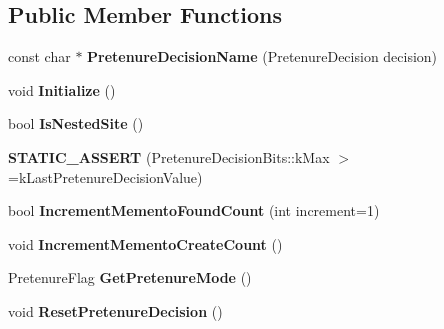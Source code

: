 \subsection*{Public Member Functions}
\begin{DoxyCompactItemize}
\item 
const char $\ast$ {\bfseries Pretenure\+Decision\+Name} (Pretenure\+Decision decision)\hypertarget{classv8_1_1internal_1_1_allocation_site_a015895d2a527877f98749eb13b16a38f}{}\label{classv8_1_1internal_1_1_allocation_site_a015895d2a527877f98749eb13b16a38f}

\item 
void {\bfseries Initialize} ()\hypertarget{classv8_1_1internal_1_1_allocation_site_a81f61008e147366d1eea6cdbae9d5ded}{}\label{classv8_1_1internal_1_1_allocation_site_a81f61008e147366d1eea6cdbae9d5ded}

\item 
bool {\bfseries Is\+Nested\+Site} ()\hypertarget{classv8_1_1internal_1_1_allocation_site_ab9a3fce3780154b3da48ae09cb0b8d46}{}\label{classv8_1_1internal_1_1_allocation_site_ab9a3fce3780154b3da48ae09cb0b8d46}

\item 
{\bfseries S\+T\+A\+T\+I\+C\+\_\+\+A\+S\+S\+E\+RT} (Pretenure\+Decision\+Bits\+::k\+Max $>$=k\+Last\+Pretenure\+Decision\+Value)\hypertarget{classv8_1_1internal_1_1_allocation_site_ad1c0e4e32b7e2db1483fa7a518bec030}{}\label{classv8_1_1internal_1_1_allocation_site_ad1c0e4e32b7e2db1483fa7a518bec030}

\item 
bool {\bfseries Increment\+Memento\+Found\+Count} (int increment=1)\hypertarget{classv8_1_1internal_1_1_allocation_site_ad402f0d78d12a670cf7eb371f65fc1c0}{}\label{classv8_1_1internal_1_1_allocation_site_ad402f0d78d12a670cf7eb371f65fc1c0}

\item 
void {\bfseries Increment\+Memento\+Create\+Count} ()\hypertarget{classv8_1_1internal_1_1_allocation_site_ac32fcfb926ce03239f5df6aca880f18c}{}\label{classv8_1_1internal_1_1_allocation_site_ac32fcfb926ce03239f5df6aca880f18c}

\item 
Pretenure\+Flag {\bfseries Get\+Pretenure\+Mode} ()\hypertarget{classv8_1_1internal_1_1_allocation_site_a06aadcce1164186ecce0962c359abb0c}{}\label{classv8_1_1internal_1_1_allocation_site_a06aadcce1164186ecce0962c359abb0c}

\item 
void {\bfseries Reset\+Pretenure\+Decision} ()\hypertarget{classv8_1_1internal_1_1_allocation_site_aa1b323951edb619dd9078164b9fabd5c}{}\label{classv8_1_1internal_1_1_allocation_site_aa1b323951edb619dd9078164b9fabd5c}


\end{DoxyCompactItemize}
